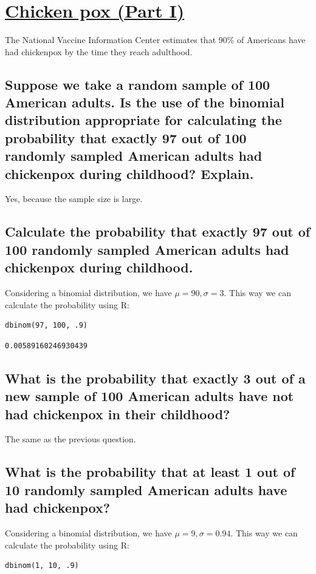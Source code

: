 \documentclass[11pt]{article}
\begin{document}
\section{\underline{Chicken pox (Part I)}}
\label{sec:orgb8dd863}
The National Vaccine Information Center estimates that 90\% of Americans have had chickenpox by the time they reach adulthood.
\subsection{Suppose we take a random sample of 100 American adults. Is the use of the binomial distribution appropriate for calculating the probability that exactly 97 out of 100 randomly sampled American adults had chickenpox during childhood? Explain.}
\label{sec:orgf61ec51}
Yes, because the sample size is large.
\subsection{Calculate the probability that exactly 97 out of 100 randomly sampled American adults had chickenpox during childhood.}
\label{sec:org3fca1c6}
Considering a binomial distribution, we have \(\mu = 90, \sigma = 3\). This way we can calculate the probability using R:

\begin{verbatim}
dbinom(97, 100, .9)
\end{verbatim}

\begin{verbatim}
0.00589160246930439
\end{verbatim}

\subsection{What is the probability that exactly 3 out of a new sample of 100 American adults have not had chickenpox in their childhood?}
\label{sec:org0bfc4b3}
The same as the previous question.
\subsection{What is the probability that at least 1 out of 10 randomly sampled American adults have had chickenpox?}
\label{sec:org7e7fed4}
Considering a binomial distribution, we have \(\mu = 9, \sigma = 0.94\). This way we can calculate the probability using R:

\begin{verbatim}
dbinom(1, 10, .9)
\end{verbatim}
\end{document}
